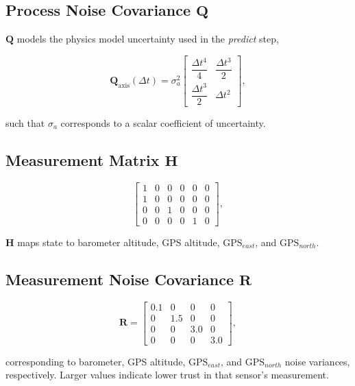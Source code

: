 \documentclass{article}
\begin{document}
\subsection{Process Noise Covariance $\mathbf{Q}$}

$\mathbf{Q}$ models the physics model uncertainty used in the \textit{predict} step, 

\begin{equation}
\mathbf{Q}_{\text{axis}}(\Delta t) =
\sigma_a^2
\begin{bmatrix}
\dfrac{\Delta t^4}{4} & \dfrac{\Delta t^3}{2} \\[6pt]
\dfrac{\Delta t^3}{2} & \Delta t^2
\end{bmatrix},    
\end{equation}

such that $\sigma_a$ corresponds to a scalar coefficient of uncertainty. 


\subsection{Measurement Matrix $\mathbf{H}$}

\begin{equation}
 \begin{bmatrix}
1 & 0 & 0 & 0 & 0 & 0 \\
1 & 0 & 0 & 0 & 0 & 0 \\
0 & 0 & 1 & 0 & 0 & 0 \\
0 & 0 & 0 & 0 & 1 & 0
\end{bmatrix},   
\end{equation}


$\mathbf{H}$ maps state to barometer altitude, GPS altitude, $\text{GPS}_{east}$, and $\text{GPS}_{north}$. 

\subsection{Measurement Noise Covariance $\mathbf{R}$}

\begin{equation}
\mathbf{R} =
\begin{bmatrix}
0.1 & 0 & 0 & 0 \\
0 & 1.5 & 0 & 0 \\
0 & 0 & 3.0 & 0 \\
0 & 0 & 0 & 3.0
\end{bmatrix},
\end{equation}


corresponding to barometer, GPS altitude, $\text{GPS}_{east}$, and $\text{GPS}_{north}$ noise variances, respectively. Larger values indicate lower trust in that sensor's measurement.
\end{document}
